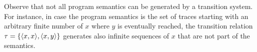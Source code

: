 \begin{remark}
  Observe that not all program semantics can be generated by a transition system.
  For instance, in case the program semantics is the set of traces starting with an arbitrary finite number of $x$ where $y$ is eventually reached, the transition relation $\tau = \{\langle x, x \rangle, \langle x, y \rangle\}$ generates also infinite sequences of $x$ that are not part of the semantics.
\end{remark}






